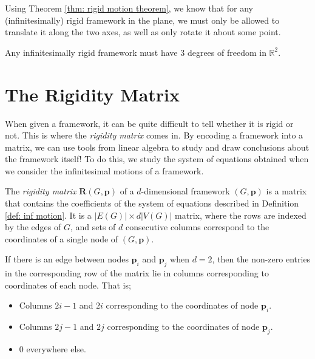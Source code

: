 \begin{flushleft}
Using Theorem \ref{thm: rigid motion theorem}, we know that for any (infinitesimally) rigid framework in the plane, we must only be allowed to translate it along the two axes, as well as only rotate it about some point.
\end{flushleft}

\begin{theorem}
\label{thm: degrees of rigid body}
\cite{counting_frameworks} Any infinitesimally rigid framework must have $3$ degrees of freedom in $\mathbb{R}^2$. 
\end{theorem}

\section{The Rigidity Matrix}

\begin{flushleft}
When given a framework, it can be quite difficult to tell whether it is rigid or not. This is where the \textit{rigidity matrix} comes in. By encoding a framework into a matrix, we can use tools from linear algebra to study and draw conclusions about the framework itself! To do this, we study the system of equations obtained when we consider the infinitesimal motions of a framework.
\end{flushleft}

\begin{definition}
\label{def: rigidity matrix}
The \textit{rigidity matrix} $\mathbf{R}(G,\mathbf{p})$ of a $d$-dimensional framework $(G,\mathbf{p})$ is a matrix that contains the coefficients of the system of equations described in Definition \ref{def: inf motion}. It is a $|E(G)| \times d|V(G)|$ matrix, where the rows are indexed by the edges of $G$, and sets of $d$ consecutive columns correspond to the coordinates of a single node of $(G,\mathbf{p})$. 

\begin{flushleft}
If there is an edge between nodes $\mathbf{p}_i$ and $\mathbf{p}_j$ when $d=2$, then the non-zero entries in the corresponding row of the matrix lie in columns corresponding to coordinates of each node. That is;    
\end{flushleft}

\begin{itemize}
    \item Columns $2i-1$ and $2i$ corresponding to the coordinates of node $\textbf{p}_i$.
    \vspace{-3mm}
    \item Columns $2j-1$ and $2j$ corresponding to the coordinates of node $\textbf{p}_j$.
    \vspace{-3mm}
    \item $0$ everywhere else.
\end{itemize}
\end{definition}

